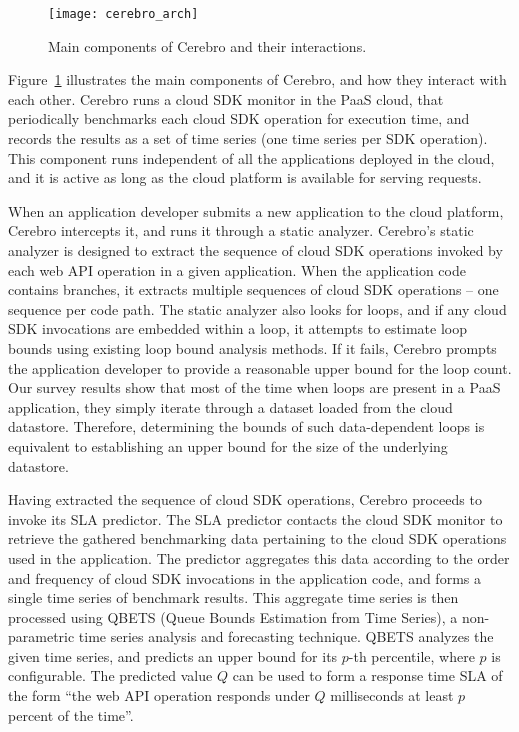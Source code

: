 \begin{figure}
\centering
\texttt{[image: cerebro\_arch]}
\caption{Main components of Cerebro and their interactions.}
\label{fig:cerebro_arch}
\vspace{-0.2in}
\end{figure}

Figure~\ref{fig:cerebro_arch} illustrates the main components of Cerebro, and how they interact with
each other. Cerebro runs a cloud SDK monitor in the PaaS cloud, that periodically benchmarks each
cloud SDK operation for execution time, and records the results as a set of time series (one time series 
per SDK operation). 
This component runs independent of all the applications deployed in the cloud, and it is active as long
as the cloud platform is available for serving requests. 

When an application developer submits a new
application to the cloud platform, Cerebro intercepts it, and runs it through a static analyzer.
Cerebro's static analyzer is designed to extract the sequence of cloud SDK operations invoked by each
web API operation in a given application. When the application code contains branches, it
extracts multiple sequences of cloud SDK operations -- one sequence per code path. The static
analyzer also looks for loops, and if any cloud SDK invocations are embedded within a loop, it attempts to
estimate loop bounds using existing loop bound analysis methods. If it fails, Cerebro prompts the 
application developer to provide a reasonable upper
bound for the loop count. Our survey results show that most of the time when loops are present in
a PaaS application, they simply iterate through a dataset loaded from the cloud datastore. 
Therefore, determining the bounds of such data-dependent loops is equivalent to establishing an 
upper bound for the size of the underlying datastore.

Having extracted the sequence of cloud SDK operations, Cerebro proceeds to invoke its SLA predictor.
The SLA predictor contacts the cloud SDK monitor to retrieve the gathered benchmarking data
pertaining to the cloud SDK operations used in the application. The predictor aggregates
this data according to the order and frequency of cloud SDK invocations in the application code, and forms a single
time series of benchmark results. This aggregate time series is then processed using QBETS (Queue
Bounds Estimation from Time Series), a 
non-parametric time series analysis and forecasting technique. QBETS analyzes the given time 
series, and predicts an upper bound for its $p$-th percentile, where $p$ is configurable. The predicted
value $Q$ can be used to form a response time SLA of the form ``the web API operation responds 
under $Q$ milliseconds at least $p$ percent of the time''.

